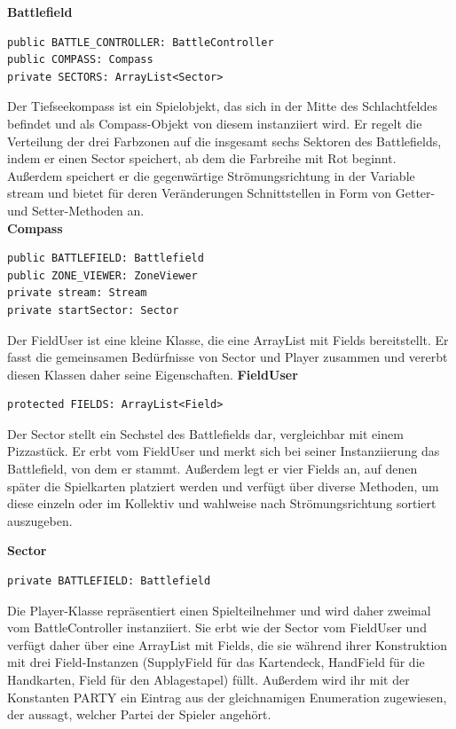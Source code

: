 \textbf{Battlefield}
\begin{lstlisting}[frame=single]
public BATTLE_CONTROLLER: BattleController 
public COMPASS: Compass
private SECTORS: ArrayList<Sector>
\end{lstlisting}
Der Tiefseekompass ist ein Spielobjekt, das sich in der Mitte des Schlachtfeldes befindet und als Compass-Objekt von diesem instanziiert wird. Er regelt die Verteilung der drei Farbzonen auf die insgesamt sechs Sektoren des Battlefields, indem er einen Sector speichert, ab dem die Farbreihe mit Rot beginnt. Außerdem speichert er die gegenwärtige Strömungsrichtung in der Variable stream und bietet für deren Veränderungen Schnittstellen in Form von Getter- und Setter-Methoden an. \\
\textbf{Compass}
\begin{lstlisting}[frame=single]
public BATTLEFIELD: Battlefield
public ZONE_VIEWER: ZoneViewer
private stream: Stream
private startSector: Sector
\end{lstlisting}
Der FieldUser ist eine kleine Klasse, die eine ArrayList mit Fields bereitstellt. Er fasst die gemeinsamen Bedürfnisse von Sector und Player zusammen und vererbt diesen Klassen daher seine Eigenschaften.
\textbf{FieldUser}
\begin{lstlisting}[frame=single]
protected FIELDS: ArrayList<Field>
\end{lstlisting}

Der Sector stellt ein Sechstel des Battlefields dar, vergleichbar mit einem Pizzastück. Er erbt vom FieldUser und merkt sich bei seiner Instanziierung das Battlefield, von dem er stammt. Außerdem legt er vier Fields an, auf denen später die Spielkarten platziert werden und verfügt über diverse Methoden, um diese einzeln oder im Kollektiv und wahlweise nach Strömungsrichtung sortiert auszugeben.

\textbf{Sector}
\begin{lstlisting}[frame=single]
private BATTLEFIELD: Battlefield
\end{lstlisting}

Die Player-Klasse repräsentiert einen Spielteilnehmer und wird daher zweimal vom BattleController instanziiert. Sie erbt wie der Sector vom FieldUser und verfügt daher über eine ArrayList mit Fields, die sie während ihrer Konstruktion mit drei Field-Instanzen (SupplyField für das Kartendeck, HandField für die Handkarten, Field für den Ablagestapel) füllt. Außerdem wird ihr   mit der Konstanten PARTY ein Eintrag aus der gleichnamigen Enumeration zugewiesen, der aussagt, welcher Partei der Spieler angehört.

